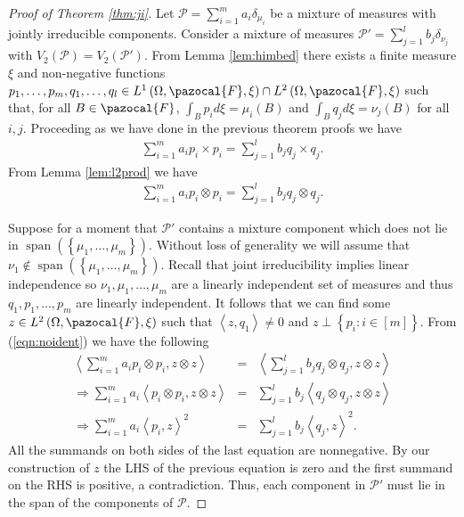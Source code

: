 \documentclass[aos,preprint]{imsart}
\def\l{\left}
\def\r{\right}
\def\sF{\pazocal{F}}
\def\sP{\mathscr{P}}
\def\spn{\operatorname{span}}
\theoremstyle{plain}
\theoremstyle{defintion}
\begin{document}
	\begin{proof}[Proof of Theorem \ref{thm:ji}]
		Let $\sP = \sum_{i=1}^m a_i \delta_{\mu_i}$ be a mixture of measures with jointly irreducible components. Consider a mixture of measures $\sP' = \sum_{j=1}^l b_j\delta_{\nu_j}$ with $V_2(\sP)= V_2(\sP')$. From Lemma \ref{lem:himbed} there exists a finite measure $\xi$ and non-negative functions $p_1,\ldots,p_m,q_1,\ldots,q_l \in L^1\left( \Omega, \sF, \xi \right)\cap L^2\left( \Omega, \sF, \xi \right)$ such that, for all $B\in \sF$, $\int_B p_i d\xi = \mu_i(B)$ and $\int_B q_j d\xi = \nu_j\left( B \right)$ for all $i,j$. Proceeding as we have done in the previous theorem proofs we have
		\begin{eqnarray*}
			\sum_{i=1}^m  a_i p_i \times p_i = \sum_{j=1}^l  b_j q_j\times q_j.
		\end{eqnarray*}
		From Lemma \ref{lem:l2prod} we have
		\begin{eqnarray}
			\label{eqn:noident}
			\sum_{i=1}^m  a_i p_i \otimes p_i = \sum_{j=1}^l  b_j q_j\otimes q_j.
		\end{eqnarray}

		Suppose for a moment that $\sP'$ contains a mixture component which does not lie in $\spn\left(\l\{ \mu_1,\ldots,\mu_m \r\}\right)$. Without loss of generality we will assume that $\nu_1 \notin \spn\left(\l\{ \mu_1,\ldots,\mu_m \r\}\right)$. Recall that joint irreducibility implies linear independence so $\nu_1,\mu_1,\ldots,\mu_m$ are a linearly independent set of measures and thus $q_1,p_1,\ldots,p_m$ are linearly independent. It follows that we can find some $z\in L^2\left( \Omega,\sF,\xi \right)$ such that $\l<z,q_1\r> \neq 0$ and $z\perp \left\{ p_i: i\in \left[ m \right] \right\}$. From (\ref{eqn:noident}) we have the following
		\begin{eqnarray*}
			\l<\sum_{i=1}^m  a_i p_i \otimes p_i,z\otimes z\r> &=& \l<\sum_{j=1}^l  b_j q_j\otimes q_j,z\otimes z\r>\\
			\Rightarrow \sum_{i=1}^m a_i\l<   p_i \otimes p_i,z\otimes z\r> &=& \sum_{j=1}^l b_j\l<   q_j\otimes q_j,z\otimes z\r>\\
			\Rightarrow \sum_{i=1}^m a_i\l<   p_i ,z\r>^2 &=& \sum_{j=1}^l b_j\l<   q_j,z\r>^2.
		\end{eqnarray*}
		All the summands on both sides of the last equation are nonnegative. By our construction of $z$ the LHS of the previous equation is zero and the first summand on the RHS is positive, a contradiction. Thus, each component in $\sP'$ must lie in the span of the components of $\sP$.


\end{proof}
\end{document}
